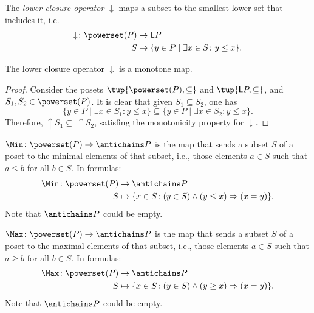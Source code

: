 \begin{definition}
The \emph{lower closure operator} $\downarrow$ maps a subset to the smallest lower set that includes it, i.e.
\begin{equation}
    \begin{aligned}
    \downarrow\colon \powerset(P)&\to \mathsf{L}P\\
    S&\mapsto \{ y\in P \mid \exists x\in S \colon y\leq x\}.
    \end{aligned}
\end{equation}
\end{definition}

\begin{lemma}
The lower closure operator $\downarrow$ is a monotone map.
\end{lemma}
\begin{proof}
Consider the posets $\tup{\powerset(P),\subseteq}$ and $\tup{\mathsf{L}P,\subseteq}$, and $S_1,S_2\in \powerset(P)$. It is clear that given $S_1\subseteq S_2$, one has
\begin{equation}
    \{y\in P\mid \exists x\in S_1\colon y\leq x\} \subseteq \{y\in P\mid \exists x\in S_2\colon y\leq x\}.
\end{equation}
Therefore, $\uparrow S_1\subseteq \ \uparrow S_2$, satisfing the monotonicity property for $\downarrow$.
\end{proof}

\begin{definition}[Min]
\label{def:Min}
$\Min \colon \powerset(P) \to \antichains P$ is the map that sends a subset $S$ of a poset to the minimal elements of that subset, i.e., those elements $a \in S$ such that $a \leq b$ for all $b \in S$. In formulas:
\begin{equation}
    \begin{aligned}
    \Min \colon \powerset(P) &\to \antichains P\\
    S&\mapsto \{ x\in S\colon (y\in S)\wedge(y\leq x)\Rightarrow (x=y)\}.
    \end{aligned}
\end{equation}
Note that $\antichains P$ could be empty.
\end{definition}

\begin{definition}[Max]
\label{def:Max}
$\Max \colon \powerset(P) \to \antichains P$ is the map that sends a subset $S$ of a poset to the maximal elements of that subset, i.e., those elements $a \in S$ such that $a \geq b$ for all $b \in S$. In formulas:
\begin{equation}
    \begin{aligned}
    \Max \colon \powerset(P) &\to \antichains P\\
    S&\mapsto \{ x\in S\colon (y\in S)\wedge(y\geq x)\Rightarrow (x=y)\}.
    \end{aligned}
\end{equation}
Note that $\antichains P$ could be empty.
\end{definition}


